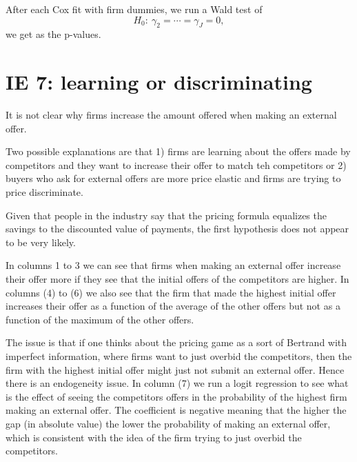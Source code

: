 \documentclass[12pt]{article}
\begin{document}
After each Cox fit with firm dummies, we run a Wald test of
$$H_0:\ \gamma_2=\cdots=\gamma_J=0,$$
we get  as the p-values. 


\section{IE 7: learning or discriminating} 

It is not clear why firms increase the amount offered when making an external offer. 

Two possible explanations are that 1) firms are learning about the offers made by competitors and they want to increase their offer to match teh competitors or 2) buyers who ask for external offers are more price elastic and firms are trying to price discriminate. 

Given that people in the industry say that the pricing formula equalizes the savings to the discounted value of payments, the first hypothesis does not appear to be very likely. 




In columns 1 to 3 we can see that firms when making an external offer increase their offer more if they see that the initial offers of the competitors are higher. In columns (4) to (6) we also see that the firm that made the highest initial offer increases their offer as a function of the average of the other offers but not as a function of the maximum of the other offers.

The issue is that if one thinks about the pricing game as a sort of Bertrand with imperfect information, where firms want to just overbid the competitors, then the firm with the highest initial offer might just not submit an external offer. Hence there is an endogeneity issue. In column (7) we run a logit regression to see what is the effect of seeing the competitors offers in the probability of the highest firm making an external offer. The coefficient is negative meaning that the higher the gap (in absolute value) the lower the probability of making an external offer, which is consistent with the idea of the firm trying to just overbid the competitors.
\end{document}

